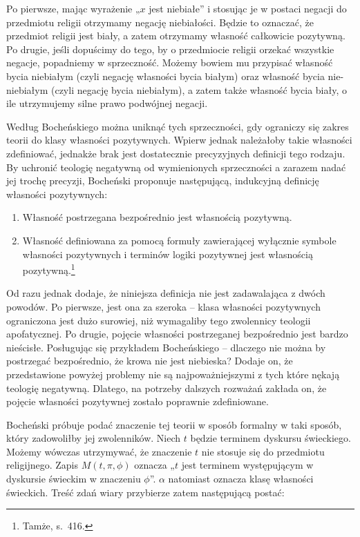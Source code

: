 Po pierwsze, mając wyrażenie „$x$ jest niebiałe” i stosując je w postaci
negacji do przedmiotu religii otrzymamy negację niebiałości. Będzie to
oznaczać, że przedmiot religii jest biały, a zatem otrzymamy własność
całkowicie pozytywną. Po drugie, jeśli dopuścimy do tego, by o
przedmiocie religii orzekać wszystkie negacje, popadniemy w
sprzeczność. Możemy bowiem mu przypisać własność bycia niebiałym (czyli
negację własności bycia białym) oraz własność bycia nie-niebiałym
(czyli negację bycia niebiałym), a zatem także własność bycia biały, o
ile utrzymujemy silne prawo podwójnej negacji.

Według Bocheńskiego można uniknąć tych sprzeczności, gdy ograniczy się
zakres teorii do klasy własności pozytywnych. Wpierw jednak należałoby
takie własności zdefiniować, jednakże brak jest dostatecznie
precyzyjnych definicji tego rodzaju. By uchronić teologię negatywną od
wymienionych sprzeczności a zarazem nadać jej trochę precyzji,
Bocheński proponuje następującą, indukcyjną definicję własności
pozytywnych:


\begin{enumerate}
\item Własność postrzegana bezpośrednio jest własnością pozytywną.
\item Własność definiowana za pomocą formuły zawierającej wyłącznie
symbole własności pozytywnych i terminów logiki pozytywnej jest
własnością pozytywną.\footnote{Tamże, s.~416. }
\end{enumerate}
Od razu jednak dodaje, że niniejsza definicja nie jest zadawalająca z
dwóch powodów. Po pierwsze, jest ona za szeroka -- klasa własności
pozytywnych ograniczona jest dużo surowiej, niż wymagaliby tego
zwolennicy teologii apofatycznej. Po drugie, pojęcie własności
postrzeganej bezpośrednio jest bardzo nieścisłe. Posługując się
przykładem Bocheńskiego -- dlaczego nie można by postrzegać
bezpośrednio, że krowa nie jest niebieska? Dodaje on, że przedstawione
powyżej problemy nie są najpoważniejszymi z tych które nękają teologię
negatywną. Dlatego, na potrzeby dalszych rozważań zakłada on, że
pojęcie własności pozytywnej zostało poprawnie zdefiniowane.

Bocheński próbuje podać znaczenie tej teorii w sposób formalny w taki
sposób, który zadowoliłby jej zwolenników. Niech $t$ będzie terminem
dyskursu świeckiego. Możemy wówczas utrzymywać, że znaczenie $t$ nie
stosuje się do przedmiotu religijnego. Zapis $M(t, \pi, \phi)$
oznacza „$t$ jest terminem występującym w dyskursie
świeckim w znaczeniu $\phi$”.
$\alpha$ natomiast oznacza klasę własności świeckich. Treść zdań wiary
przybierze zatem następującą postać:

